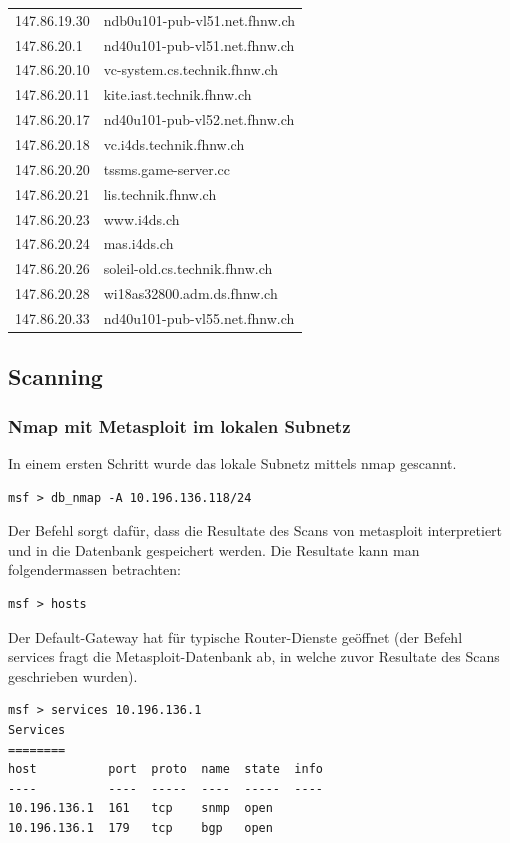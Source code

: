 \documentclass[a4paper,11pt]{scrartcl}
\begin{document}
\begin{longtable}{p{2.5cm}|p{7cm}}
	147.86.19.30 & ndb0u101-pub-vl51.net.fhnw.ch \\ 
	147.86.20.1 & nd40u101-pub-vl51.net.fhnw.ch \\ 
	147.86.20.10 & vc-system.cs.technik.fhnw.ch \\ 
	147.86.20.11 & kite.iast.technik.fhnw.ch \\ 
	147.86.20.17 & nd40u101-pub-vl52.net.fhnw.ch \\ 
	147.86.20.18 & vc.i4ds.technik.fhnw.ch \\ 
	147.86.20.20 & tssms.game-server.cc \\ 
	147.86.20.21 & lis.technik.fhnw.ch \\ 
	147.86.20.23 & www.i4ds.ch \\ 
	147.86.20.24 & mas.i4ds.ch \\ 
	147.86.20.26 & soleil-old.cs.technik.fhnw.ch \\ 
	147.86.20.28 & wi18as32800.adm.ds.fhnw.ch \\ 
	147.86.20.33 & nd40u101-pub-vl55.net.fhnw.ch \\ 
\end{longtable}

\FloatBarrier
\subsection{Scanning}
\subsubsection{Nmap mit Metasploit im lokalen Subnetz}
In einem ersten Schritt wurde das lokale Subnetz mittels nmap gescannt.
\begin{verbatim}msf > db_nmap -A 10.196.136.118/24\end{verbatim}
Der Befehl sorgt dafür, dass die Resultate des Scans von metasploit interpretiert und in die Datenbank gespeichert werden. Die Resultate kann man folgendermassen betrachten:
\begin{verbatim}msf > hosts\end{verbatim}

Der Default-Gateway hat für typische Router-Dienste geöffnet (der Befehl services fragt die Metasploit-Datenbank ab, in welche zuvor Resultate des Scans geschrieben wurden).
\begin{lstlisting}
msf > services 10.196.136.1
Services
========
host          port  proto  name  state  info
----          ----  -----  ----  -----  ----
10.196.136.1  161   tcp    snmp  open   
10.196.136.1  179   tcp    bgp   open
\end{lstlisting}
\end{document}
